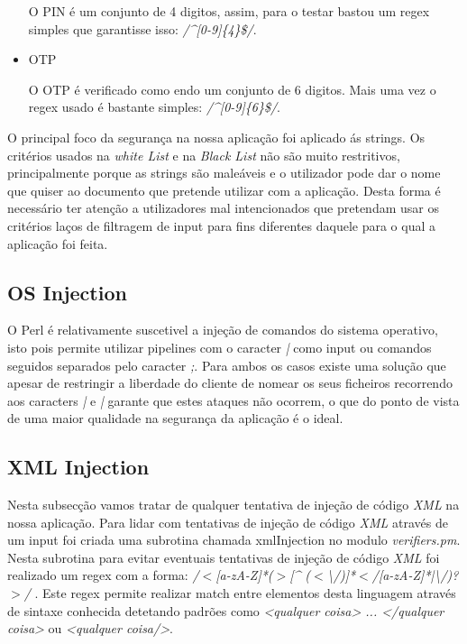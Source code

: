 \begin{itemize}
\par O PIN é um conjunto de 4 digitos, assim, para o testar bastou um regex simples que garantisse isso: \textit{/\^{}[0-9]\{4\}\$/}.

\hfill\newline
\item OTP\newline
\par O OTP é verificado como endo um conjunto de 6 digitos. Mais uma vez o regex usado é bastante simples: \textit{/\^{}[0-9]\{6\}\$/}.

\end{itemize}


O principal foco da segurança na nossa aplicação foi aplicado ás strings. Os critérios usados na \textit{white List} e na \textit{Black List} não são muito restritivos, principalmente porque as strings são maleáveis e o utilizador pode dar o nome que quiser ao documento que pretende utilizar com a aplicação. Desta forma é necessário ter atenção a utilizadores mal intencionados que pretendam usar os critérios laços de filtragem de input para fins diferentes daquele para o qual a aplicação foi feita.\newline


\subsection{OS Injection}

O Perl é relativamente suscetivel a injeção de comandos do sistema operativo, isto pois permite utilizar pipelines com o caracter \textit{|} como input ou comandos seguidos separados pelo caracter \textit{;}. Para ambos os casos existe uma solução que apesar de restringir a liberdade do cliente de nomear os seus ficheiros recorrendo aos caracters \textit{|} e \textit{|} garante que estes ataques não ocorrem, o que do ponto de vista de uma maior qualidade na segurança da aplicação é o ideal.


\subsection{XML Injection}

Nesta subsecção vamos tratar de qualquer tentativa de injeção de código \textit{XML} na nossa aplicação. Para lidar com tentativas de injeção de código \textit{XML} através de um input foi criada uma subrotina chamada {xmlInjection} no modulo \textit{verifiers.pm}.\newline
Nesta subrotina para evitar eventuais tentativas de injeção de código \textit{XML} foi realizado um regex com a forma: \textit{/$<$[a-zA-Z]*($>$[\^{} ($<$\textbackslash/)]*$<$/[a-zA-Z]*|\textbackslash/)?$>$/} . Este regex permite realizar match entre elementos desta linguagem através de sintaxe conhecida detetando padrões como \textit{<qualquer coisa> ... </qualquer coisa>} ou \textit{<qualquer coisa/>}.

